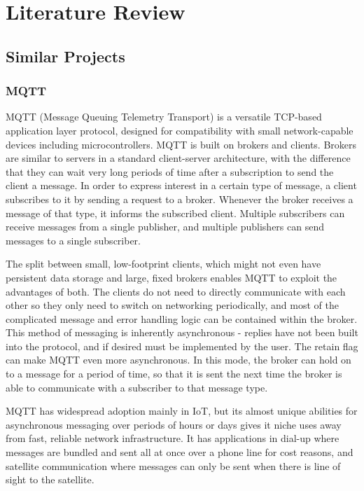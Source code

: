 \documentclass{article}
\begin{document}
\pagebreak
\section{Literature Review}
\subsection{Similar Projects}
\subsubsection{MQTT}
MQTT (Message Queuing Telemetry Transport) is a versatile TCP-based application layer protocol, designed for compatibility with small network-capable devices including microcontrollers. MQTT is built on brokers and clients. Brokers are similar to servers in a standard client-server architecture, with the difference that they can wait very long periods of time after a subscription to send the client a message. In order to express interest in a certain type of message, a client subscribes to it by sending a request to a broker. Whenever the broker receives a message of that type, it informs the subscribed client. Multiple subscribers can receive messages from a single publisher, and multiple publishers can send messages to a single subscriber.

The split between small, low-footprint clients, which might not even have persistent data storage and large, fixed brokers enables MQTT to exploit the advantages of both. The clients do not need to directly communicate with each other so they only need to switch on networking periodically, and most of the complicated message and error handling logic can be contained within the broker. This method of messaging is inherently asynchronous - replies have not been built into the protocol, and if desired must be implemented by the user. The retain flag can make MQTT even more asynchronous. In this mode, the broker can hold on to a message for a period of time, so that it is sent the next time the broker is able to communicate with a subscriber to that message type. 

MQTT has widespread adoption mainly in IoT, but its almost unique abilities for asynchronous messaging over periods of hours or days gives it niche uses away from fast, reliable network infrastructure. It has applications in dial-up where messages are bundled and sent all at once over a phone line for cost reasons, and satellite communication where messages can only be sent when there is line of sight to the satellite.
\end{document}
